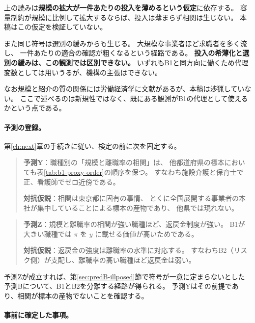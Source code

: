 \begin{remark}[機構は識別されない]
\label{rem:b1-proxy-assumption}
上の読みは\textbf{規模の拡大が一件あたりの投入を薄めるという仮定}に依存する。
容量制約が規模に比例して拡大するならば、投入は薄まらず相関は生じない。
本稿はこの仮定を検証していない。

また同じ符号は選別の緩みからも生じる。
大規模な事業者ほど求職者を多く流し、
一件あたりの適合の確認が粗くなるという経路である。
\textbf{投入の希薄化と選別の緩みは、この観測では区別できない。}
いずれもB1と同方向に働くため代理変数としては用いうるが、機構の主張はできない。

なお規模と紹介の質の関係には労働経済学に文献があるが、本稿は渉猟していない。
ここで述べるのは新規性ではなく、既にある観測がB1の代理として使えるかという点である。
\end{remark}

\paragraph{予測の登録。}
第\ref{ch:next}章の手続きに従い、検定の前に次を固定する。

\begin{quote}
\textbf{予測Y}：職種別の「規模と離職率の相関」は、
他都道府県の標本においても表\ref{tab:b1-proxy-order}の順序を保つ。
すなわち施設介護と保育士で正、看護師でゼロ近傍である。

\textbf{対抗仮説}：相関は東京都に固有の事情、
とくに全国展開する事業者の本社が集中していることによる標本の産物であり、
他県では現れない。
\end{quote}

\begin{quote}
\textbf{予測Z}：規模と離職率の相関が強い職種ほど、返戻金制度が強い。
B1が大きい職種では $\pi$ を $y$ に載せる価値が高いためである。

\textbf{対抗仮説}：返戻金の強度は離職率の水準に対応する。
すなわちB2（リスク側）が支配し、離職率の高い職種ほど返戻金は弱い。
\end{quote}

予測Zが成立すれば、第\ref{sec:predB-illposed}節で符号が一意に定まらないとした
予測Bについて、B1とB2を分離する経路が得られる。
予測Yはその前提であり、相関が標本の産物でないことを確認する。

\paragraph{事前に確定した事項。}

